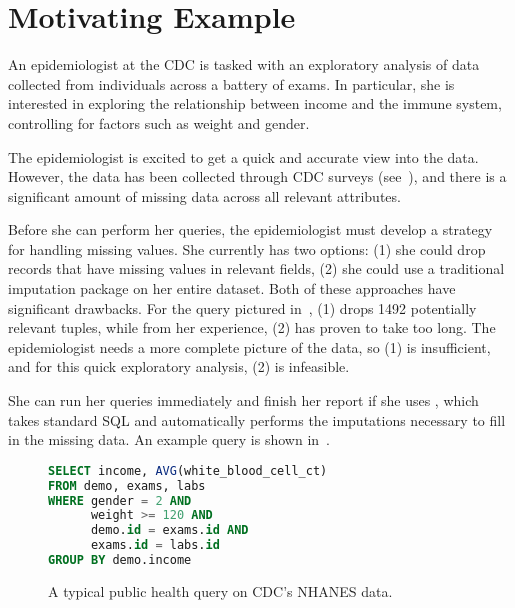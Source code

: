 \section{Motivating Example}
An epidemiologist at the CDC is tasked with an 
exploratory analysis of data collected from individuals across
a battery of exams. In particular, she is interested in exploring
the relationship between income and the immune system,
controlling for factors such as weight and gender.

The epidemiologist is excited
to get a quick and accurate view into the data. However,
the data has been collected through CDC surveys (see~),
and there is a significant amount of missing data across all
relevant attributes. 

Before she can perform her queries, the epidemiologist must develop a strategy
for handling missing values. She currently has two options:
(1) she could drop records that have missing values in relevant fields,
(2) she could use a traditional imputation package on her entire dataset. Both of these
approaches have significant drawbacks. For the query pictured in~, 
(1) drops 1492 potentially relevant tuples,
while from her experience, (2) has proven to take too long. The epidemiologist needs a more complete picture
of the data, so (1) is insufficient, and for this quick exploratory analysis, (2)
is infeasible.

She can run her queries immediately and finish her report if
she uses \ProjectName{}, which takes standard SQL and automatically performs the imputations
necessary to fill in the missing data.
An example query is shown in~.

\begin{figure}
  \captionsetup{labelfont=bf}
\begin{lstlisting}[language=SQL]
SELECT income, AVG(white_blood_cell_ct)
FROM demo, exams, labs
WHERE gender = 2 AND 
      weight >= 120 AND
      demo.id = exams.id AND 
      exams.id = labs.id
GROUP BY demo.income
\end{lstlisting}
\caption{A typical public health query on CDC's NHANES data.}
\label{fig:example-query}
\end{figure}

